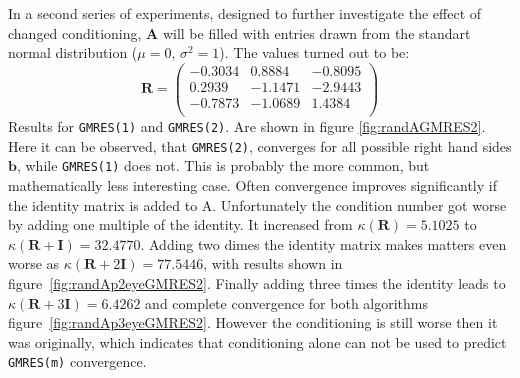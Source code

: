 In a second series of experiments, designed to further investigate the effect of changed conditioning, $\mathbf{A}$ will be filled with entries drawn from the standart normal distribution ($\mu = 0$, $\sigma^2 = 1$). The values turned out to be:
\begin{equation}
\mathbf{R} = \begin{pmatrix}
-0.3034 &   0.8884 &  -0.8095 \\
 0.2939 &  -1.1471 &  -2.9443 \\
-0.7873 &  -1.0689 &   1.4384 \\
\end{pmatrix} 
\end{equation}
Results for \texttt{GMRES(1)} and \texttt{GMRES(2)}. Are shown in figure \ref{fig:randAGMRES2}. Here it can be observed, that \texttt{GMRES(2)}, converges for all possible right hand sides $\mathbf{b}$, while \texttt{GMRES(1)} does not. This is probably the more common, but mathematically less interesting case. Often convergence improves significantly if the identity matrix is added to A. Unfortunately the condition number got worse by adding one multiple of the identity. It increased from $\kappa(\mathbf{R})=5.1025$ to $\kappa(\mathbf{R} + \mathbf{I})=32.4770$. Adding two dimes the identity matrix makes matters even worse as $\kappa(\mathbf{R} + 2\mathbf{I})=77.5446$, with results shown in figure~\ref{fig:randAp2eyeGMRES2}. Finally adding three times the identity leads to $\kappa(\mathbf{R} + 3\mathbf{I})=6.4262$ and complete convergence for both algorithms figure~\ref{fig:randAp3eyeGMRES2}. However the conditioning is still worse then it was originally, which indicates that conditioning alone can not be used to predict \texttt{GMRES(m)} convergence. 

